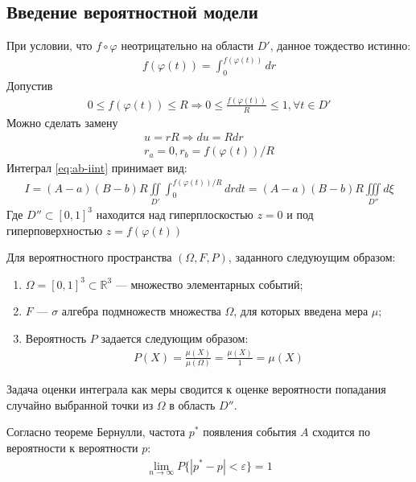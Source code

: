 \subsection{Введение вероятностной модели}
При условии, что \(f\circ\varphi\) неотрицательно на области \(D'\), данное тождество истинно:
\begin{align}
	f(\varphi(t)) = \int_0^{f(\varphi(t))}dr
\end{align}
Допустив
\begin{align}
	0 \leq f(\varphi(t)) \leq R \Longrightarrow 0 \leq \frac{f(\varphi(t))}{R} \leq 1, \forall t \in D'
\end{align}
Можно сделать замену
\begin{align}
	u = r R \Longrightarrow du = R dr \\
	r_a = 0, r_b = f(\varphi(t))/R
\end{align}
Интеграл \cref{eq:ab-iint} принимает вид:
\begin{align}
	I = (A - a)(B - b)R\iint\limits_{D'}\int_0^{f(\varphi(t))/R}drdt = (A - a)(B - b)R \iiint\limits_{D''}d\xi
\end{align}
Где \(D'' \subset [0,1]^3\) находится над гиперплоскостью \(z = 0\) и под гиперповерхностью \(z =f(\varphi(t))\)

Для вероятностного пространства \((\Omega, F, P)\), заданного следуюущим образом:
\begin{enumerate}
	\item \(\Omega = [0,1]^3 \subset \mathbb{R}^3\) --- множество элементарных событий;
	\item \(F\) --- \(\sigma\) алгебра подмножеств множества \(\Omega\), для которых введена мера \(\mu\);
	\item Вероятность \(P\) задается следующим образом:
	      \begin{align*}
		      P(X) = \frac{\mu(X)}{\mu(\Omega)} = \frac{\mu(X)}{1} = \mu(X)
	      \end{align*}
\end{enumerate}
Задача оценки интеграла как меры сводится к оценке вероятности попадания случайно выбранной точки из \(\Omega\) в область \(D''\).

Согласно теореме Бернулли, частота \(p^*\) появления события \(A\) сходится по вероятности к вероятности \(p\):
\begin{align}
	\lim_{n\to\infty}P\{|p^* - p| < \varepsilon \} = 1
\end{align}

